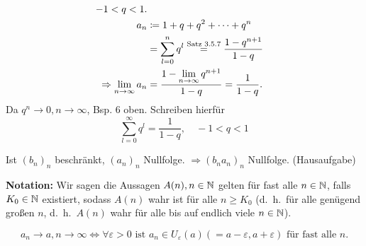 \documentclass[../ana1.tex]{subfiles}
\begin{document}
\begin{bsp}
	\begin{align*}
		-1<q<1.\\
		a_n &\coloneqq 1 + q + q^2 + \cdots + q^n\\
		&= \sum_{l=0}^{n} q^l \overset{\text{Satz 3.5.7}}{=} \frac{1-q^{n+1}}{1-q}\\
		\Rightarrow \lim\limits_{n\rightarrow\infty} a_n &= \frac{1- \lim\limits_{n\rightarrow\infty} q^{n+1}}{1-q} = \frac{1}{1-q}.
	\end{align*}
	Da \(q^n \rightarrow 0, n\rightarrow\infty \), Bsp. 6 oben.
	Schreiben hierfür \[ \sum_{l=0}^{\infty} q^l = \frac{1}{1-q}, \quad -1<q<1 \]
\end{bsp}

\begin{bsp}
	Ist \( {(b_n)}_n \) beschränkt, \( {(a_n)}_n \) Nullfolge. \( \Rightarrow {(b_n a_n)}_n \) Nullfolge. (Hausaufgabe)
\end{bsp}

\textbf{Notation:} Wir sagen die Aussagen \( A(n), n\in\mathbb{N} \) gelten für fast alle \( n\in\mathbb{N} \), falls \( K_0\in\mathbb{N} \) existiert, sodass \(A(n)\) wahr ist für alle \( n\geq K_0 \) (d.\ h.\ für alle genügend großen \( n \), d.\ h.\  \( A(n) \) wahr für alle bis auf endlich viele \(n\in\mathbb{N} \)).

\begin{bsp}
	\[ a_n\rightarrow a,n\rightarrow\infty \Leftrightarrow \forall \varepsilon > 0 \text{ ist } a_n\in U_\varepsilon(a) (= a-\varepsilon, a+\varepsilon) \text{ für fast alle } n.  \]
\end{bsp}
\end{document}
